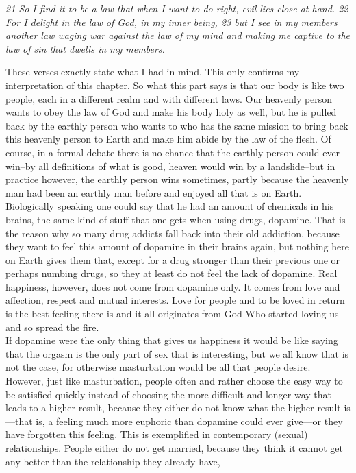 \emph{21 So I find it to be a law that when I want to do right, evil
lies close at hand. 22 For I delight in the law of God, in my inner
being, 23 but I see in my members another law waging war against the law
of my mind and making me captive to the law of sin that dwells in my
members.}

These verses exactly state what I had in mind. This only confirms my
interpretation of this chapter. So what this part says is that our body
is like two people, each in a different realm and with different laws.
Our heavenly person wants to obey the law of God and make his body holy
as well, but he is pulled back by the earthly person who wants to who
has the same mission to bring back this heavenly person to Earth and
make him abide by the law of the flesh. Of course, in a formal debate
there is no chance that the earthly person could ever win--by all
definitions of what is good, heaven would win by a landslide--but in
practice however, the earthly person wins sometimes, partly because the
heavenly man had been an earthly man before and enjoyed all that is on
Earth. Biologically speaking one could say that he had an amount of
chemicals in his brains, the same kind of stuff that one gets when using
drugs, dopamine. That is the reason why so many drug addicts fall back
into their old addiction, because they want to feel this amount of
dopamine in their brains again, but nothing here on Earth gives them
that, except for a drug stronger than their previous one or perhaps
numbing drugs, so they at least do not feel the lack of dopamine. Real
happiness, however, does not come from dopamine only. It comes from love
and affection, respect and mutual interests. Love for people and to be
loved in return is the best feeling there is and it all originates from
God Who started loving us and so spread the fire.\\
If dopamine were the only thing that gives us happiness it would be like
saying that the orgasm is the only part of sex that is interesting, but
we all know that is not the case, for otherwise masturbation would be
all that people desire. However, just like masturbation, people often
and rather choose the easy way to be satisfied quickly instead of
choosing the more difficult and longer way that leads to a higher
result, because they either do not know what the higher result is---that
is, a feeling much more euphoric than dopamine could ever give---or they
have forgotten this feeling. This is exemplified in contemporary
(sexual) relationships. People either do not get married, because they
think it cannot get any better than the relationship they already have,
